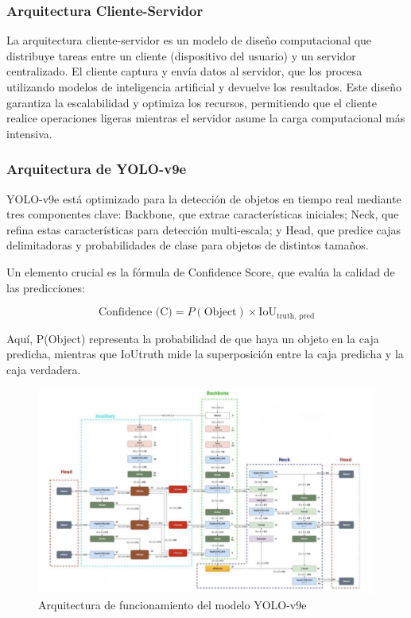 \documentclass{article}
\begin{document}
\subsubsection{Arquitectura Cliente-Servidor}

La arquitectura cliente-servidor es un modelo de diseño computacional que distribuye tareas entre un cliente (dispositivo del usuario) y un servidor centralizado. El cliente captura y envía datos al servidor, que los procesa utilizando modelos de inteligencia artificial y devuelve los resultados. Este diseño garantiza la escalabilidad y optimiza los recursos, permitiendo que el cliente realice operaciones ligeras mientras el servidor asume la carga computacional más intensiva.

\subsubsection{Arquitectura de YOLO-v9e}

YOLO-v9e está optimizado para la detección de objetos en tiempo real mediante tres componentes clave: Backbone, que extrae características iniciales; Neck, que refina estas características para detección multi-escala; y Head, que predice cajas delimitadoras y probabilidades de clase para objetos de distintos tamaños.

Un elemento crucial es la fórmula de Confidence Score, que evalúa la calidad de las predicciones:

\[
\text{Confidence (C)} = P(\text{Object}) \times \text{IoU}_{\text{truth, pred}}
\]

Aquí, P(Object) representa la probabilidad de que haya un objeto en la caja predicha, mientras que IoUtruth mide la superposición entre la caja predicha y la caja verdadera.

\begin{figure}[!hbtp]
    \centering
    \includegraphics[width=5in]{figuras/yolov9.png}
		\caption{Arquitectura de funcionamiento del modelo YOLO-v9e}
		\label{fig5}
\end{figure}
\end{document}

